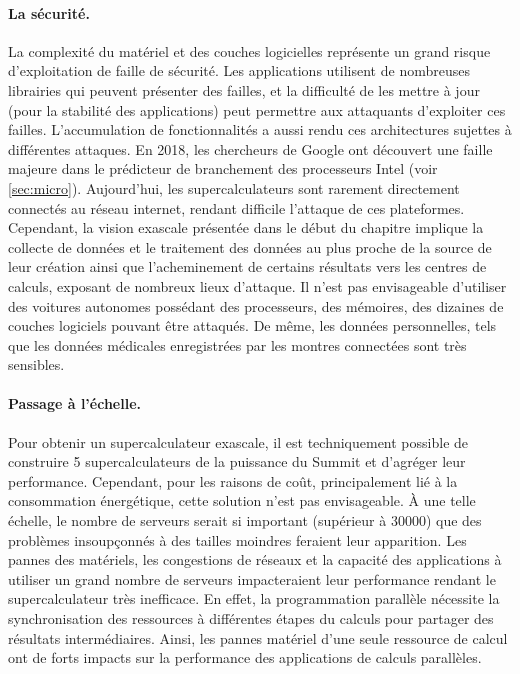         \paragraph{La sécurité.} La complexité du matériel et des couches logicielles représente un grand risque d'exploitation de faille de sécurité. Les applications utilisent de nombreuses librairies qui peuvent présenter des failles, et la difficulté de les mettre à jour (pour la stabilité des applications) peut permettre aux attaquants d'exploiter ces failles. L'accumulation de fonctionnalités a aussi rendu ces architectures sujettes à différentes attaques. En 2018, les chercheurs de Google \cite{kocher2018spectre} ont découvert une faille majeure dans le prédicteur de branchement des processeurs Intel (voir \autoref{sec:micro}). Aujourd'hui, les supercalculateurs sont rarement directement connectés au réseau internet, rendant difficile l'attaque de ces plateformes. Cependant, la vision exascale présentée dans le début du chapitre implique la collecte de données et le traitement des données au plus proche de la source de leur création ainsi que l'acheminement de certains résultats vers les centres de calculs, exposant de nombreux lieux d'attaque. Il n’est pas envisageable d'utiliser des voitures autonomes possédant des processeurs, des mémoires, des dizaines de couches logiciels pouvant être attaqués. De même, les données personnelles, tels que les données médicales enregistrées par les montres connectées sont très sensibles.
    
        
        \paragraph{Passage à l'échelle.} Pour obtenir un supercalculateur exascale, il est techniquement possible de construire 5 supercalculateurs de la puissance du Summit et d’agréger leur performance. Cependant, pour les raisons de coût, principalement lié à la consommation énergétique, cette solution n’est pas envisageable. À une telle échelle, le nombre de serveurs serait si important (supérieur à 30000) que des problèmes insoupçonnés à des tailles moindres feraient leur apparition. Les pannes des matériels, les congestions de réseaux et la capacité des applications à utiliser un grand nombre de serveurs impacteraient leur performance rendant le supercalculateur très inefficace. En effet, la programmation parallèle nécessite la synchronisation des ressources à différentes étapes du calculs pour partager des résultats intermédiaires. Ainsi, les pannes matériel d'une seule ressource de calcul ont de forts impacts sur la performance des applications de calculs parallèles. 
        

